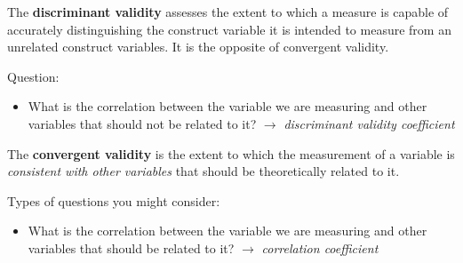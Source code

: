 \documentclass[
  11pt,
  a4paper,
  twoside,symmetric,openright]{book}
\providecommand{\tightlist}{%
  \setlength{\itemsep}{0pt}\setlength{\parskip}{0pt}}
\theoremstyle{break}
\theoremstyle{break}
\begin{document}
\begin{definition}
\protect\hypertarget{def:defdiscriminantvalidity}{}\label{def:defdiscriminantvalidity}The \textbf{discriminant validity} assesses the extent to which a measure is capable of accurately distinguishing the construct variable it is intended to measure from an unrelated construct variables. It is the opposite of convergent validity.
\end{definition}

Question:

\begin{itemize}
\tightlist
\item
  What is the correlation between the variable we are measuring and other variables that should not be related to it? \(\rightarrow\) \emph{discriminant validity coefficient}
\end{itemize}

\begin{definition}
\protect\hypertarget{def:defconvergentvalidity}{}\label{def:defconvergentvalidity}The \textbf{convergent validity} is the extent to which the measurement of a variable is \emph{consistent with other variables} that should be theoretically related to it.
\end{definition}

Types of questions you might consider:

\begin{itemize}
\tightlist
\item
  What is the correlation between the variable we are measuring and other variables that should be related to it? \(\rightarrow\) \emph{correlation coefficient}
\end{itemize}
\end{document}
